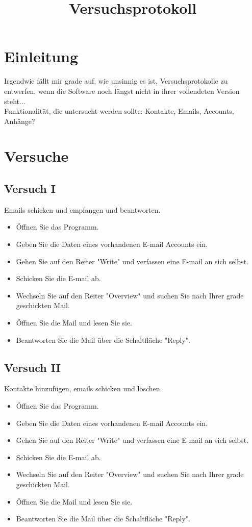\documentclass[10pt,a4paper]{article}
\title{Versuchsprotokoll}
\begin{document}
\maketitle
\section*{Einleitung}
Irgendwie fällt mir grade auf, wie unsinnig es ist, Versuchsprotokolle zu entwerfen, wenn die Software noch 
längst nicht in ihrer vollendeten Version steht...\\
Funktionalität, die untersucht werden sollte: Kontakte, Emails, Accounts, Anhänge?
\section*{Versuche}
\subsection*{Versuch I}
Emails schicken und empfangen und beantworten.
\begin{itemize}
	\item Öffnen Sie das Programm.
	\item Geben Sie die Daten eines vorhandenen E-mail Accounts ein.
	\item Gehen Sie auf den Reiter "Write" und verfassen eine E-mail an sich selbst. 
	\item Schicken Sie die E-mail ab.
	\item Wechseln Sie auf den Reiter "Overview" und suchen Sie nach Ihrer grade geschickten Mail.
	\item Öffnen Sie die Mail und lesen Sie sie.
	\item Beantworten Sie die Mail über die Schaltfläche "Reply".	
\end{itemize}
\subsection*{Versuch II}
Kontakte hinzufügen, emails schicken und löschen.
\begin{itemize}
	\item Öffnen Sie das Programm.
	\item Geben Sie die Daten eines vorhandenen E-mail Accounts ein.
	\item Gehen Sie auf den Reiter "Write" und verfassen eine E-mail an sich selbst. 
	\item Schicken Sie die E-mail ab.
	\item Wechseln Sie auf den Reiter "Overview" und suchen Sie nach Ihrer grade geschickten Mail.
	\item Öffnen Sie die Mail und lesen Sie sie.
	\item Beantworten Sie die Mail über die Schaltfläche "Reply".	
\end{itemize}
\end{document}

